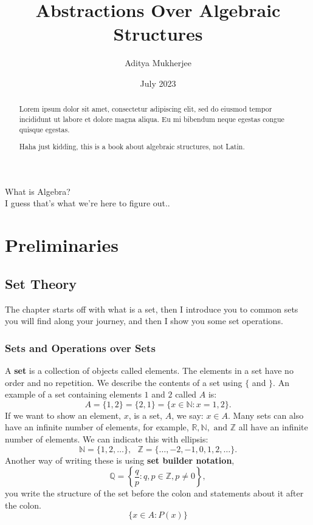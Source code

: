 \documentclass{report}
\title{Abstractions Over Algebraic Structures}
\author{Aditya Mukherjee}
\date{July 2023}
\begin{document}
\maketitle

\begin{center}
    What is Algebra?\\
    \vspace*{2cm}
    I guess that's what we're here to figure out..
\end{center}

\tableofcontents

\begin{abstract}
    \begin{center}
        Lorem ipsum dolor sit amet, consectetur adipiscing elit, sed do eiusmod tempor incididunt ut labore et dolore magna aliqua. Eu mi bibendum neque egestas congue quisque egestas.
        \vspace*{2cm}
        
        Haha just kidding, this is a book about algebraic structures, not Latin.
    \end{center}
\end{abstract}
\part{Preliminaries}
\chapter{Set Theory}
The chapter starts off with what is a set, then I introduce you to common sets you will find along your journey, and then I show you some set operations.
\section{Sets and Operations over Sets}
A \textbf{set} is a collection of objects called elements. The elements in a set have no order and no repetition. We describe the contents of a set using $\{$ and $\}$.
An example of a set containing elements $1$ and $2$ called $A$ is: $$A = \{1, 2\} = \{2, 1\} = \{x \in \mathbb{N} : x = 1,2 \}.$$ If we want to show an element, $x$, is a set, $A$, we say: $x \in A$.
Many sets can also have an infinite number of elements, for example, $\mathbb{R}, \mathbb{N}, \text{ and } \mathbb{Z}$ all have an infinite number of elements.
We can indicate this with ellipsis: $$\mathbb{N} = \{1, 2, \dots \},\text{ } \mathbb{Z} = \{\dots, -2, -1, 0, 1, 2, \dots \}.$$
Another way of writing these is using \textbf{set builder notation},
$$\mathbb{Q} = \left\{\frac{q}{p} : q,p \in \mathbb{Z}, p \neq 0 \right\},$$
you write the structure of the set before the colon and statements about it after the colon.
$$\{x \in A : P(x)\}$$
\end{document}
